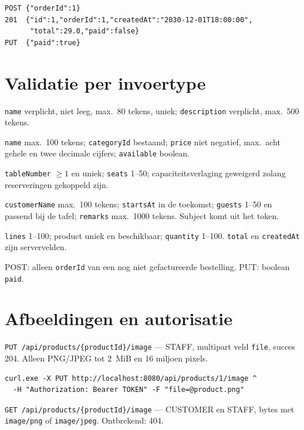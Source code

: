 \documentclass[11pt]{article}
\begin{document}
\begin{lstlisting}
POST {"orderId":1}
201  {"id":1,"orderId":1,"createdAt":"2030-12-01T18:00:00",
      "total":29.0,"paid":false}
PUT  {"paid":true}
\end{lstlisting}

\section{Validatie per invoertype}
\begin{description}[style=nextline,leftmargin=2.4cm]
  \item[Categorie] \texttt{name} verplicht, niet leeg, max.\ 80 tekens, uniek;
        \texttt{description} verplicht, max.\ 500 tekens.
  \item[Product] \texttt{name} max.\ 100 tekens; \texttt{categoryId} bestaand;
        \texttt{price} niet negatief, max.\ acht gehele en twee decimale cijfers;
        \texttt{available} boolean.
  \item[Tafel] \texttt{tableNumber} $\ge 1$ en uniek; \texttt{seats} 1--50;
        capaciteitsverlaging geweigerd zolang reserveringen gekoppeld zijn.
  \item[Reservering] \texttt{customerName} max.\ 100 tekens; \texttt{startsAt}
        in de toekomst; \texttt{guests} 1--50 en passend bij de tafel;
        \texttt{remarks} max.\ 1000 tekens. Subject komt uit het token.
  \item[Bestelling] \texttt{lines} 1--100; product uniek en beschikbaar;
        \texttt{quantity} 1--100. \texttt{total} en \texttt{createdAt} zijn
        servervelden.
  \item[Factuur] POST: alleen \texttt{orderId} van een nog niet gefactureerde
        bestelling. PUT: boolean \texttt{paid}.
\end{description}

\section{Afbeeldingen en autorisatie}
\texttt{PUT /api/products/\{productId\}/image} --- STAFF, multipart veld
\texttt{file}, succes 204. Alleen PNG/JPEG tot 2~MiB en 16 miljoen pixels.

\begin{lstlisting}
curl.exe -X PUT http://localhost:8080/api/products/1/image ^
  -H "Authorization: Bearer TOKEN" -F "file=@product.png"
\end{lstlisting}

\texttt{GET /api/products/\{productId\}/image} --- CUSTOMER en STAFF, bytes met
\texttt{image/png} of \texttt{image/jpeg}. Ontbrekend: 404.
\end{document}
